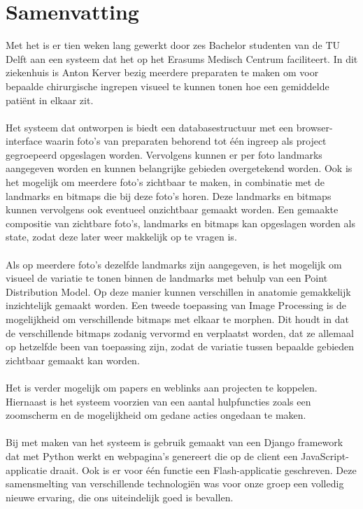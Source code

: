\section{Samenvatting}

Met het \casamproject is er tien weken lang gewerkt door zes Bachelor studenten van de TU Delft aan een 
systeem dat het \casamproject op het Erasums Medisch Centrum faciliteert. 
In dit ziekenhuis is Anton Kerver bezig meerdere preparaten te maken om voor bepaalde chirurgische ingrepen visueel te kunnen tonen hoe een gemiddelde pati\"{e}nt in elkaar zit.
\\
\\
Het systeem dat ontworpen is biedt een databasestructuur met een browser-interface waarin foto's van 
preparaten behorend tot \'{e}\'{e}n ingreep als project gegroepeerd opgeslagen worden. 
Vervolgens kunnen er per foto landmarks aangegeven worden en kunnen belangrijke gebieden overgetekend worden.
Ook is het mogelijk om meerdere foto's zichtbaar te maken, in combinatie met de landmarks en bitmaps die bij deze foto's horen.
Deze landmarks en bitmaps kunnen vervolgens ook eventueel onzichtbaar gemaakt worden.
Een gemaakte compositie van zichtbare foto's, landmarks en bitmaps kan opgeslagen worden als state, zodat deze later weer makkelijk op te vragen is.
\\
\\
Als op meerdere foto's dezelfde landmarks zijn aangegeven, is het mogelijk om visueel de variatie te tonen binnen de landmarks met behulp van een Point Distribution Model. 
Op deze manier kunnen verschillen in anatomie gemakkelijk inzichtelijk gemaakt worden.
Een tweede toepassing van Image Processing is de mogelijkheid om verschillende bitmaps met elkaar te morphen. 
Dit houdt in dat de verschillende bitmaps zodanig vervormd en verplaatst worden, dat ze allemaal op hetzelfde been van toepassing zijn,
zodat de variatie tussen bepaalde gebieden zichtbaar gemaakt kan worden.
\\
\\
Het is verder mogelijk om papers en weblinks aan projecten te koppelen.
Hiernaast is het systeem voorzien van een aantal hulpfuncties zoals een zoomscherm en de mogelijkheid om gedane acties ongedaan te maken. 
\\
\\
Bij met maken van het systeem is gebruik gemaakt van een Django framework dat met Python werkt en webpagina's genereert die op de client een JavaScript-applicatie draait. 
Ook is er voor \'{e}\'{e}n functie een Flash-applicatie geschreven.
Deze samensmelting van verschillende technologi\"{e}n was voor onze groep een volledig nieuwe ervaring, die 
ons uiteindelijk goed is bevallen.
